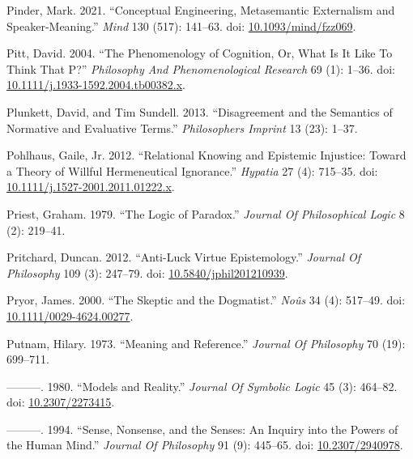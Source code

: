 \documentclass[
  10pt,
  letterpaper,
  DIV=11,
  numbers=noendperiod,
  twoside]{scrartcl}
\newlength{\cslhangindent}
\newenvironment{CSLReferences}[2] %
 {\begin{list}{}{%
  \setlength{\itemindent}{0pt}
  \setlength{\leftmargin}{0pt}
  \setlength{\parsep}{0pt}
  \ifodd #1
   \setlength{\leftmargin}{\cslhangindent}
   \setlength{\itemindent}{-1\cslhangindent}
  \fi
  \setlength{\itemsep}{#2\baselineskip}}}
 {\end{list}}
\begin{document}
\begin{CSLReferences}{1}{0}
Pinder, Mark. 2021. {``Conceptual Engineering, Metasemantic Externalism
and Speaker-Meaning.''} \emph{Mind} 130 (517): 141--63. doi:
\href{https://doi.org/10.1093/mind/fzz069}{10.1093/mind/fzz069}.

Pitt, David. 2004. {``The Phenomenology of Cognition, Or, What Is It
Like To Think That P?''} \emph{Philosophy And Phenomenological Research}
69 (1): 1--36. doi:
\href{https://doi.org/10.1111/j.1933-1592.2004.tb00382.x}{10.1111/j.1933-1592.2004.tb00382.x}.

Plunkett, David, and Tim Sundell. 2013. {``Disagreement and the
Semantics of Normative and Evaluative Terms.''} \emph{Philosophers
Imprint} 13 (23): 1--37.

Pohlhaus, Gaile, Jr. 2012. {``Relational Knowing and Epistemic
Injustice: Toward a Theory of Willful Hermeneutical Ignorance.''}
\emph{Hypatia} 27 (4): 715--35. doi:
\href{https://doi.org/10.1111/j.1527-2001.2011.01222.x}{10.1111/j.1527-2001.2011.01222.x}.

Priest, Graham. 1979. {``The Logic of Paradox.''} \emph{Journal Of
Philosophical Logic} 8 (2): 219--41.

Pritchard, Duncan. 2012. {``Anti-Luck Virtue Epistemology.''}
\emph{Journal Of Philosophy} 109 (3): 247--79. doi:
\href{https://doi.org/10.5840/jphil201210939}{10.5840/jphil201210939}.

Pryor, James. 2000. {``The Skeptic and the Dogmatist.''} \emph{Noûs} 34
(4): 517--49. doi:
\href{https://doi.org/10.1111/0029-4624.00277}{10.1111/0029-4624.00277}.

Putnam, Hilary. 1973. {``Meaning and Reference.''} \emph{Journal Of
Philosophy} 70 (19): 699--711.

---------. 1980. {``Models and Reality.''} \emph{Journal Of Symbolic
Logic} 45 (3): 464--82. doi:
\href{https://doi.org/10.2307/2273415}{10.2307/2273415}.

---------. 1994. {``Sense, Nonsense, and the Senses: An Inquiry into the
Powers of the Human Mind.''} \emph{Journal Of Philosophy} 91 (9):
445--65. doi: \href{https://doi.org/10.2307/2940978}{10.2307/2940978}.


\end{CSLReferences}
\end{document}
